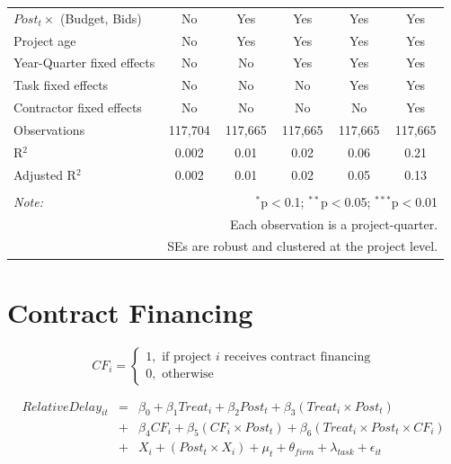 \documentclass[
]{article}
\begin{document}
\begin{table}[H]
\begin{tabular}{@{\extracolsep{-2pt}}lccccc}
$Post_t \times$  (Budget, Bids) & No & Yes & Yes & Yes & Yes \\ 
Project age & No & Yes & Yes & Yes & Yes \\ 
Year-Quarter fixed effects & No & No & Yes & Yes & Yes \\ 
Task fixed effects & No & No & No & Yes & Yes \\ 
Contractor fixed effects & No & No & No & No & Yes \\ 
Observations & 117,704 & 117,665 & 117,665 & 117,665 & 117,665 \\ 
R$^{2}$ & 0.002 & 0.01 & 0.02 & 0.06 & 0.21 \\ 
Adjusted R$^{2}$ & 0.002 & 0.01 & 0.02 & 0.05 & 0.13 \\ 
\hline 
\hline \\[-1.8ex] 
\textit{Note:}  & \multicolumn{5}{r}{$^{*}$p$<$0.1; $^{**}$p$<$0.05; $^{***}$p$<$0.01} \\ 
 & \multicolumn{5}{r}{Each observation is a project-quarter.} \\ 
 & \multicolumn{5}{r}{SEs are robust and clustered at the project level.} \\ 
\end{tabular} 
\end{table}

\hypertarget{contract-financing}{%
\section{Contract Financing}\label{contract-financing}}

\[ CF_i = \begin{cases} 1, \text{ if project } i \text{ receives contract financing}\\
0, \text{ otherwise} \end{cases}\]

\[ \begin{aligned}
RelativeDelay_{it} &=& \beta_0+\beta_1 Treat_i + \beta_2 Post_t + \beta_3 (Treat_i \times Post_t) \\
&+&\beta_4 CF_i + \beta_5 (CF_i \times Post_t) + \beta_6 (Treat_i \times Post_t \times CF_i) \\ 
&+&X_i + (Post_t \times X_i) + \mu_t + \theta_{firm} + \lambda_{task}+ \epsilon_{it}
\end{aligned}\]
\end{document}
